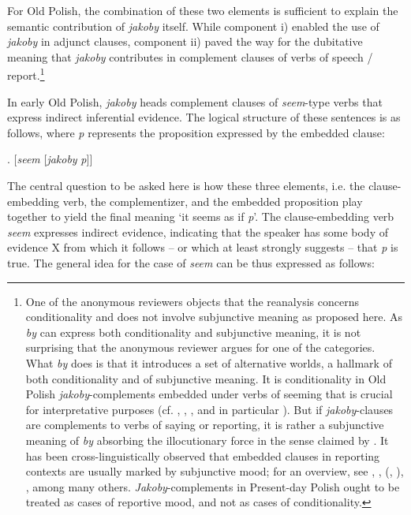 \documentclass[output=paper
,modfonts
,nonflat]{langsci/langscibook}
\begin{document}
\noindent For Old Polish, the combination of these two elements is sufficient to explain the semantic contribution of \emph{jakoby} itself. While component i) enabled the use of \emph{jakoby} in adjunct clauses, component ii) paved the way for the dubitative meaning that \emph{jakoby} contributes in complement clauses of verbs of speech / report.\footnote{One of the anonymous reviewers objects that the reanalysis concerns conditionality and does not involve subjunctive meaning as proposed here.  As \emph{by} can express both conditionality and subjunctive meaning, it is not surprising that the anonymous reviewer argues for one of the categories. What \emph{by} does is that it introduces a set of alternative worlds, a hallmark of both conditionality and of subjunctive meaning. It is conditionality in Old Polish \emph{jakoby}-complements embedded under verbs of seeming that is crucial for interpretative purposes (cf. \textcite{Stalnaker1968}, \textcite{Lewis1973}, \textcite{Fintel2011}, and in particular \textcite{Bucking2017}). But if \emph{jakoby}-clauses are complements to verbs of saying or reporting, it is rather a subjunctive meaning of \emph{by} absorbing the illocutionary force in the sense claimed by \textcite{Truckenbrodt2006}. It has been cross-linguistically observed that embedded clauses in reporting contexts are usually marked by subjunctive mood; for an overview, see \textcite{Becker-Remberger2010}, \textcite{Fabricius-Hansen-Saebo2004}, \citeauthor{Portner1997} (\citeyear{Portner1997}, \citeyear{Portner2018}), \textcite{Sode2014}, among many others. \emph{Jakoby}-complements in Present-day Polish ought to be treated as cases of reportive mood, and not as cases of conditionality. 
} 

\noindent In early Old Polish, \emph{jakoby} heads complement clauses of \emph{seem}-type verbs that express indirect inferential evidence. The logical structure of these sentences is as follows, where \emph{p} represents the proposition expressed by the embedded clause:

\ex.	[\emph{seem} [\emph{jakoby} \emph{p}]] 

The central question to be asked here is how these three elements, i.e. the clause-embedding verb, the complementizer, and the embedded proposition play together to yield the final meaning `it seems as if \emph{p}'. The clause-embedding verb \emph{seem} expresses indirect evidence, indicating that the speaker has some body of evidence X from which it follows – or which at least strongly suggests – that \emph{p} is true. The general idea for the case of \emph{seem} can be thus expressed as follows: 
\end{document}
